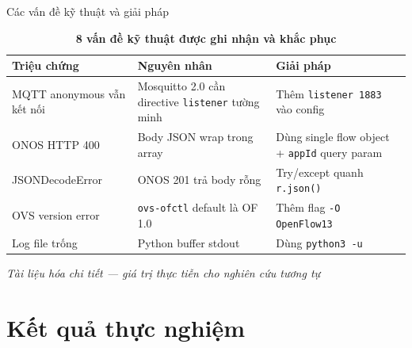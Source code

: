 \documentclass[aspectratio=169, 12pt]{beamer}
\begin{document}
\begin{frame}{Các vấn đề kỹ thuật và giải pháp}

\begin{table}
\caption*{\textbf{8 vấn đề kỹ thuật được ghi nhận và khắc phục}}
\renewcommand{\arraystretch}{1.3}
\begin{tabular}{p{}p{}p{}}
\toprule
\textbf{Triệu chứng} & \textbf{Nguyên nhân} & \textbf{Giải pháp} \\
\midrule
MQTT anonymous vẫn kết nối & Mosquitto 2.0 cần directive \texttt{listener} tường minh & Thêm \texttt{listener 1883} vào config \\
ONOS HTTP 400 & Body JSON wrap trong array & Dùng single flow object + \texttt{appId} query param \\
JSONDecodeError & ONOS 201 trả body rỗng & Try/except quanh \texttt{r.json()} \\
OVS version error & \texttt{ovs-ofctl} default là OF 1.0 & Thêm flag \texttt{-O OpenFlow13} \\
Log file trống & Python buffer stdout & Dùng \texttt{python3 -u} \\
\bottomrule
\end{tabular}
\end{table}

\begin{center}
\textit{Tài liệu hóa chi tiết — giá trị thực tiễn cho nghiên cứu tương tự}
\end{center}

\end{frame}

\section{Kết quả thực nghiệm}
\end{document}
